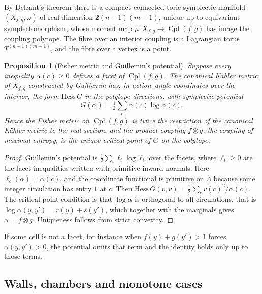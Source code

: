\documentclass[11pt]{article}
\newtheorem{proposition}[theorem]{Proposition}
\theoremstyle{definition}
\theoremstyle{remark}
\newcommand{\Cpl}{\operatorname{Cpl}}
\begin{document}
By Delzant's theorem \cite{Delzant1988} there is a compact connected toric symplectic manifold
$(X_{f,g},\omega)$ of real dimension $2(n-1)(m-1)$, unique up to equivariant symplectomorphism, whose
moment map $\mu\colon X_{f,g}\to\Cpl(f,g)$ has image the coupling polytope. The fibre over an interior
coupling is a Lagrangian torus $T^{(n-1)(m-1)}$, and the fibre over a vertex is a point.

\begin{proposition}[Fisher metric and Guillemin's potential]\label{prop:guillemin}
Suppose every inequality $\alpha(c)\ge0$ defines a facet of $\Cpl(f,g)$. The canonical K\"ahler metric
of $X_{f,g}$ constructed by Guillemin \cite{Guillemin1994} has, in action--angle coordinates over the
interior, the form $\mathrm{Hess}\,G$ in the polytope directions, with symplectic potential
\[
G(\alpha)=\tfrac12\sum_{c}\alpha(c)\log\alpha(c).
\]
Hence the Fisher metric on $\Cpl(f,g)$ is twice the restriction of the canonical K\"ahler metric to the
real section, and the product coupling $f\otimes g$, the coupling of maximal entropy, is the unique
critical point of $G$ on the polytope.
\end{proposition}
\begin{proof}
Guillemin's potential is $\tfrac12\sum_i\ell_i\log\ell_i$ over the facets, where $\ell_i\ge0$ are the
facet inequalities written with primitive inward normals. Here $\ell_c(\alpha)=\alpha(c)$, and the
coordinate functional is primitive on $\Lambda$ because some integer circulation has entry $1$ at $c$.
Then $\mathrm{Hess}\,G(v,v)=\tfrac12\sum_cv(c)^2/\alpha(c)$. The critical-point condition is that
$\log\alpha$ is orthogonal to all circulations, that is $\log\alpha(y,y')=r(y)+s(y')$, which together with
the marginals gives $\alpha=f\otimes g$. Uniqueness follows from strict convexity.
\end{proof}

If some cell is not a facet, for instance when $f(y)+g(y')>1$ forces $\alpha(y,y')>0$, the potential
omits that term and the identity holds only up to those terms.

\subsection{Walls, chambers and monotone cases}
\end{document}
